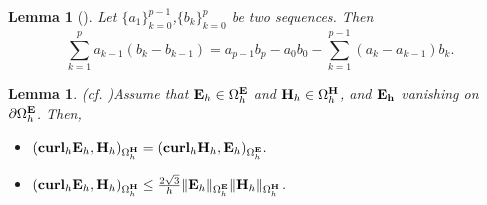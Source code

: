 \documentclass[12pt,reqno]{amsart}
\newcommand{\curl}{{\bf curl}}
\newcommand{\e}{{\bf E}}
\newcommand{\h}{{\bf H}}
\newtheorem{lem}[theorem]{Lemma}
\newtheorem{lemma}[theorem]{Lemma}
\theoremstyle{definition}
\numberwithin{equation}{section}
\def\Gwh{\Omega_h}
\begin{document}
 

\begin{lem}[\cite{Morton}]
Let $\{a_1\}_{k=0}^{p-1}$,$\{b_k\}_{k=0}^{p}$ be two sequences. Then
$$
\sum_{k=1}^{p}a_{k-1}(b_k-b_{k-1})=a_{p-1}b_p-a_{0}b_0-\sum_{k=1}^{p-1}(a_{k}-a_{k-1})b_k.
$$
\end{lem}



\begin{lemma}(cf. \cite[(37)]{sakka} )\label{lem:sym}
	Assume that $\e_h\in \Gwh^\e$ and $\h_h\in \Gwh^\h$, and
	$\bf{E}_h$ vanishing on $\partial \Gwh^{\bf{E}}$. Then,
	\begin{itemize}
		\item  
		$
		(\curl_h\e_h,\h_h)_{\Gwh^\h}=
		(\curl_h\h_h,\e_h)_{\Gwh^\e}.
		$\\[1mm]
		\item $(\curl _h\e_h,\h_h)_{\Gwh^\h}\leq
		  \frac{2\sqrt{3}}{h}\|\e_h\|_{\Gwh^\e}
		\|\h_h\|_{\Gwh^\h}
		$.

	\end{itemize}

\end{lemma}
\end{document}
